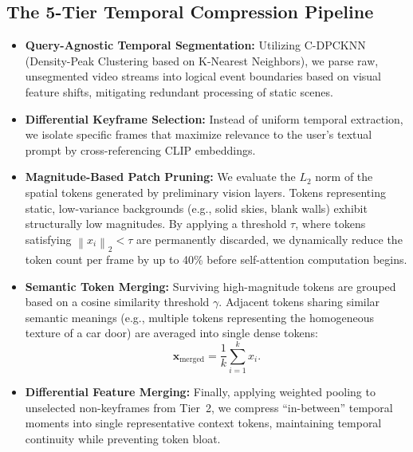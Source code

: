 \documentclass[conference]{IEEEtran}
\newcommand{\Ltwonorm}[1]{\left\|#1\right\|_{2}}
\begin{document}
\subsection{The 5-Tier Temporal Compression Pipeline}

\begin{itemize}

  \item \textbf{Query-Agnostic Temporal Segmentation:} Utilizing
  C-DPCKNN (Density-Peak Clustering based on K-Nearest Neighbors), we
  parse raw, unsegmented video streams into logical event boundaries
  based on visual feature shifts, mitigating redundant processing of
  static scenes.

  \item \textbf{Differential Keyframe Selection:} Instead of uniform
  temporal extraction, we isolate specific frames that maximize relevance
  to the user's textual prompt by cross-referencing CLIP embeddings.

  \item \textbf{Magnitude-Based Patch Pruning:} We evaluate the $L_2$
  norm of the spatial tokens generated by preliminary vision layers.
  Tokens representing static, low-variance backgrounds (e.g., solid
  skies, blank walls) exhibit structurally low magnitudes. By applying a
  threshold $\tau$, where tokens satisfying
  $\Ltwonorm{x_i} < \tau$ are permanently discarded, we dynamically
  reduce the token count per frame by up to 40\% before self-attention
  computation begins.

  \item \textbf{Semantic Token Merging:} Surviving high-magnitude tokens
  are grouped based on a cosine similarity threshold $\gamma$. Adjacent
  tokens sharing similar semantic meanings (e.g., multiple tokens
  representing the homogeneous texture of a car door) are averaged into
  single dense tokens:
  \begin{equation}
    \mathbf{x}_{\mathrm{merged}} = \frac{1}{k}\sum_{i=1}^{k} x_i.
    \label{eq:merging}
  \end{equation}

  \item \textbf{Differential Feature Merging:} Finally, applying
  weighted pooling to unselected non-keyframes from Tier~2, we compress
  ``in-between'' temporal moments into single representative context
  tokens, maintaining temporal continuity while preventing token bloat.

\end{itemize}
\end{document}
